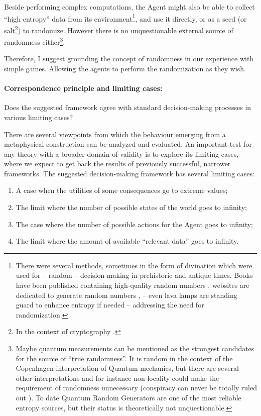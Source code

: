 \documentclass{article}
\begin{document}
Beside performing complex computations, the Agent might also be able to collect ``high entropy'' data from its environment\footnote{There were several methods, sometimes in the form of divination \cite{paper:DivinationArticle} which were used for -- random -- decision-making in prehistoric and antique times. Books have been published containing high-quality random numbers \cite{book:RandomDigits,book:RandomDigits2022}, websites are dedicated to generate random numbers \cite{web:random.org,web:drand,web:hotbits}, -- even lava lamps are standing guard to enhance entropy if needed \cite{web:Lavarand} -- addressing the need for randomization.}, and use it directly, or as a seed (or salt\footnote{In the context of cryptography \cite{web:rfc4086RandomSeed,book:CryptographicSecurityArchitecture}.}) to randomize. However there is no unquestionable external source of randomness either\footnote{Maybe quantum measurements can be mentioned as the strongest candidates for the source of ``true randomness''. It is random in the context of the Copenhagen interpretation of Quantum mechanics, but there are several other interpretations and for instance non-locality could make the requirement of randomness unnecessary (conspiracy can never be totally ruled out \cite{book:tHooftCellularAutomaton}). To date Quantum Random Generators \cite{paper:QuantumRandomNumberGenerators,paper:QRandomNumbers} are one of the most reliable entropy sources, but their status is theoretically not unquestionable.}.

Therefore, I suggest grounding the concept of randomness in our experience with simple games. Allowing the agents to perform the randomization as they wish.

\paragraph{Correspondence principle and limiting cases:}
Does the suggested framework agree with standard decision-making processes in various limiting cases?

There are several viewpoints from which the behaviour emerging from a metaphysical construction can be analyzed and evaluated. An important test for any theory with a broader domain of validity is to explore its limiting cases, where we expect to get back the results of previously successful, narrower frameworks. The suggested decision-making framework has several limiting cases:

\begin{enumerate}
    \item A case when the utilities of some consequences go to extreme values;
    \item The limit where the number of possible states of the world goes to infinity;
    \item The case where the number of possible actions for the Agent goes to infinity;
    \item The limit where the amount of available ``relevant data'' goes to infinity.
\end{enumerate}
\end{document}
